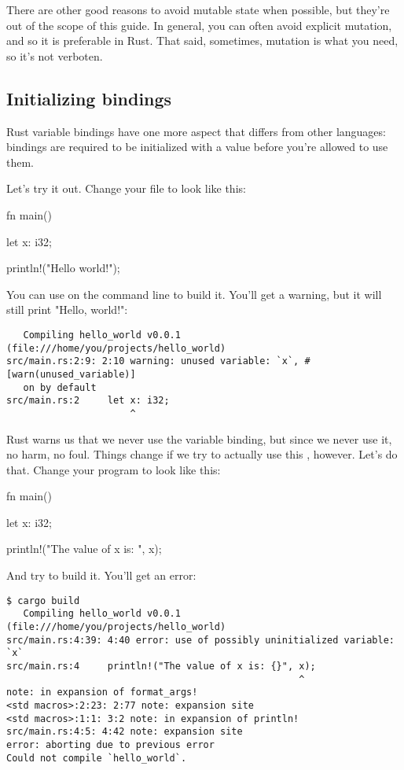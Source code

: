 \blank

There are other good reasons to avoid mutable state when possible, but they're out of the scope of this guide. In general, you can
often avoid explicit mutation, and so it is preferable in Rust. That said, sometimes, mutation is what you need, so it's not 
verboten.

\subsection*{Initializing bindings}

Rust variable bindings have one more aspect that differs from other languages: bindings are required to be initialized with a 
value before you're allowed to use them.

\blank

Let's try it out. Change your  file to look like this:

\begin{rustc}
fn main() {
    let x: i32;

    println!("Hello world!");
}
\end{rustc}

You can use  on the command line to build it. You'll get a warning, but it will still print "Hello, world!":

\begin{verbatim}
   Compiling hello_world v0.0.1 (file:///home/you/projects/hello_world)
src/main.rs:2:9: 2:10 warning: unused variable: `x`, #[warn(unused_variable)]
   on by default
src/main.rs:2     let x: i32;
                      ^
\end{verbatim}

Rust warns us that we never use the variable binding, but since we never use it, no harm, no foul. Things change if we try to
actually use this \x, however. Let's do that. Change your program to look like this:

\begin{rustc}
fn main() {
    let x: i32;

    println!("The value of x is: {}", x);
}
\end{rustc}

And try to build it. You'll get an error:

\begin{verbatim}
$ cargo build
   Compiling hello_world v0.0.1 (file:///home/you/projects/hello_world)
src/main.rs:4:39: 4:40 error: use of possibly uninitialized variable: `x`
src/main.rs:4     println!("The value of x is: {}", x);
                                                    ^
note: in expansion of format_args!
<std macros>:2:23: 2:77 note: expansion site
<std macros>:1:1: 3:2 note: in expansion of println!
src/main.rs:4:5: 4:42 note: expansion site
error: aborting due to previous error
Could not compile `hello_world`.
\end{verbatim}

